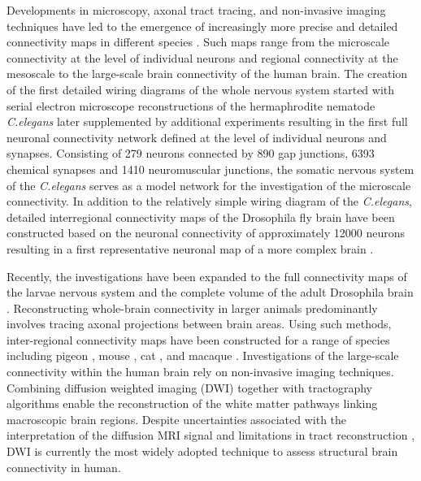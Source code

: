 Developments in microscopy, axonal tract tracing, and non-invasive imaging techniques have led to the emergence of increasingly more precise and detailed connectivity maps in different species \citep{Bota2015,Chiang2011a,Oh2014,Scannell1999,Shanahan2013,Stephan2001,VanEssen2013,White1986}. Such maps range from the microscale connectivity at the level of individual neurons and regional connectivity at the mesoscale to the large-scale brain connectivity of the human brain. The creation of the first detailed wiring diagrams of the whole nervous system started with serial electron microscope reconstructions of the hermaphrodite nematode \textit{C.elegans} \citep{White1986} later supplemented by additional experiments \citep{Varshney2011} resulting in the first full neuronal connectivity network defined at the level of individual neurons and synapses. Consisting of 279 neurons connected by 890 gap junctions, 6393 chemical synapses and 1410 neuromuscular junctions, the somatic nervous system of the \textit{C.elegans} serves as a model network for the investigation of the microscale connectivity. In addition to the relatively simple wiring diagram of the \textit{C.elegans}, detailed interregional connectivity maps of the Drosophila fly brain have been constructed based on the neuronal connectivity of approximately \num{12000} neurons resulting in a first representative neuronal map of a more complex brain \citep{Chiang2011a}.

Recently, the investigations have been expanded to the full connectivity maps of the larvae nervous system \citep{Ohyama2015} and the complete volume of the adult Drosophila brain \citep{Zheng2018}. Reconstructing whole-brain connectivity in larger animals predominantly involves tracing axonal projections between brain areas. Using such methods, inter-regional connectivity maps have been constructed for a range of species including pigeon \citep{Shanahan2013}, mouse \citep{Oh2014}, cat \citep{Scannell1995}, and macaque \citep{Harriger2012}. Investigations of the large-scale connectivity within the human brain rely on non-invasive imaging techniques. Combining diffusion weighted imaging (DWI) together with tractography algorithms \citep{Jbabdi2011} enable the reconstruction of the white matter pathways linking macroscopic brain regions. Despite uncertainties associated with the interpretation of the diffusion MRI signal and limitations in tract reconstruction \citep{Jones2010,Jones2013,Thomas2014}, DWI is currently the most widely adopted technique to assess structural brain connectivity in human.

